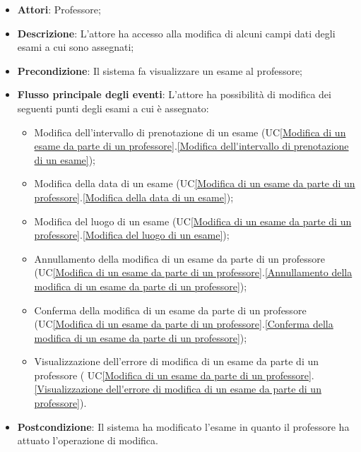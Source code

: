 \begin{itemize}
	\item \textbf{Attori}: Professore;
	\item \textbf{Descrizione}: L'attore ha accesso alla modifica di alcuni campi dati degli esami a cui sono assegnati;
	\item \textbf{Precondizione}: Il sistema fa visualizzare un esame al professore;
	
	\item \textbf{Flusso principale degli eventi}: L'attore ha possibilità di modifica dei seguenti punti degli esami a cui è assegnato:
	\begin{itemize}
		\item Modifica dell'intervallo di prenotazione di un esame (UC\ref{Modifica di un esame da parte di un professore}.\ref{Modifica dell'intervallo di prenotazione di un esame});
		\item Modifica della data di un esame (UC\ref{Modifica di un esame da parte di un professore}.\ref{Modifica della data di un esame});
		\item Modifica del luogo di un esame (UC\ref{Modifica di un esame da parte di un professore}.\ref{Modifica del luogo di un esame});
		\item Annullamento della modifica di un esame da parte di un professore (UC\ref{Modifica di un esame da parte di un professore}.\ref{Annullamento della modifica di un esame da parte di un professore});
		\item Conferma della modifica di un esame da parte di un professore (UC\ref{Modifica di un esame da parte di un professore}.\ref{Conferma della modifica di un esame da parte di un professore});
		\item Visualizzazione dell'errore di modifica di un esame da parte di un professore ( UC\ref{Modifica di un esame da parte di un professore}.\ref{Visualizzazione dell'errore di modifica di un esame da parte di un professore}).
	\end{itemize}
	\item \textbf{Postcondizione}: Il sistema ha modificato l'esame in quanto il professore ha attuato l'operazione di modifica.
	
\end{itemize}

